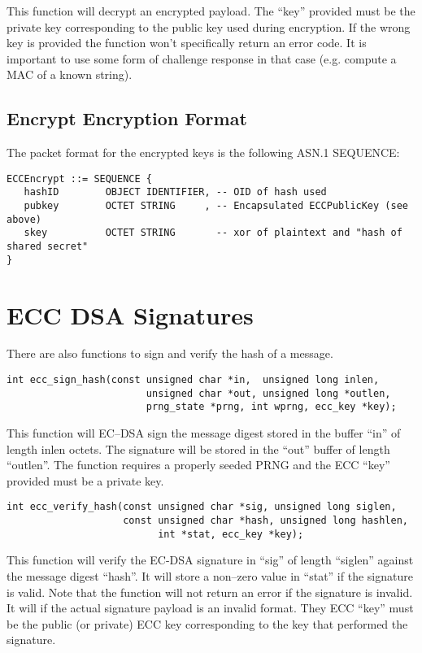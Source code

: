 \documentclass[a4paper]{book}
\begin{document}
This function will decrypt an encrypted payload.  The ``key'' provided must be the private key corresponding to the public key
used during encryption.  If the wrong key is provided the function won't specifically return an error code.  It is important
to use some form of challenge response in that case (e.g. compute a MAC of a known string).

\subsection{Encrypt Encryption Format}

The packet format for the encrypted keys is the following ASN.1 SEQUENCE:

\begin{verbatim}
ECCEncrypt ::= SEQUENCE {
   hashID        OBJECT IDENTIFIER, -- OID of hash used
   pubkey        OCTET STRING     , -- Encapsulated ECCPublicKey (see above)
   skey          OCTET STRING       -- xor of plaintext and "hash of shared secret"
}
\end{verbatim}

\section{ECC DSA Signatures}

There are also functions to sign and verify the hash of a message.
\begin{verbatim}
int ecc_sign_hash(const unsigned char *in,  unsigned long inlen,
                        unsigned char *out, unsigned long *outlen,
                        prng_state *prng, int wprng, ecc_key *key);
\end{verbatim}

This function will EC--DSA sign the message digest stored in the buffer ``in'' of length inlen octets.  The signature
will be stored in the ``out'' buffer of length ``outlen''.  The function requires a properly seeded PRNG and 
the ECC ``key'' provided must be a private key.

\begin{verbatim}
int ecc_verify_hash(const unsigned char *sig, unsigned long siglen,
                    const unsigned char *hash, unsigned long hashlen, 
                          int *stat, ecc_key *key);
\end{verbatim}

This function will verify the EC-DSA signature in ``sig'' of length ``siglen'' against the message digest ``hash''.  
It will store a non--zero value in ``stat'' if the signature is valid.  Note that the function will not return
an error if the signature is invalid.  It will if the actual signature payload is an invalid format.  They ECC ``key''
must be the public (or private) ECC key corresponding to the key that performed the signature.
\end{document}
